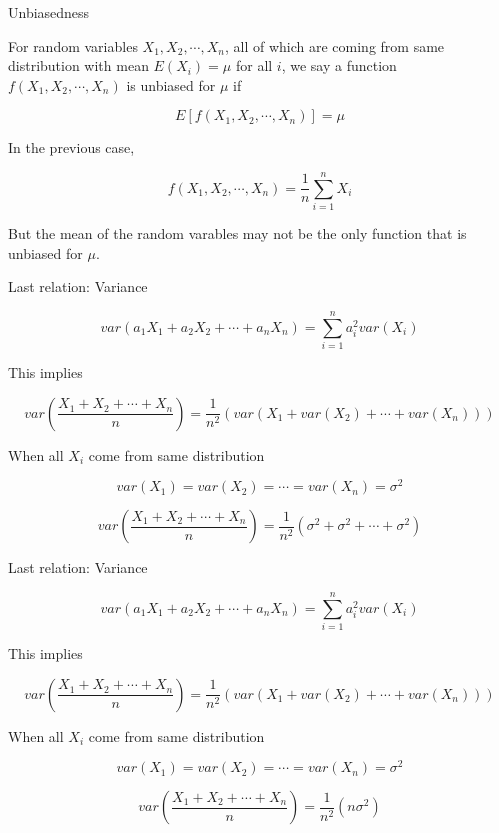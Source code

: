 \documentclass{beamer}\usepackage[]{graphicx}\usepackage[]{color}
\begin{document}
\begin{frame}{Unbiasedness}

For random variables $X_1, X_2, \cdots, X_n$, all of which are coming from same distribution with mean $E(X_i)=\mu$ for all $i$,  we say a function $f(X_1, X_2, \cdots, X_n)$
is unbiased for $\mu$ if 

$$ E \left [f(X_1, X_2, \cdots, X_n) \right ] =  \mu$$

In the previous case, 

$$ f(X_1, X_2, \cdots, X_n) = \frac{1}{n} \sum_{i=1}^{n} X_{i}  $$

But the mean of the random varables may not be the only function that is unbiased for 
$\mu$. 

\end{frame}


\begin{frame}{Last relation: Variance}

$$ var(a_1X_1+ a_2 X_2 + \cdots + a_nX_n) = \sum_{i=1}^{n} a^2_{i} var (X_{i}) $$ \pause

This implies 

$$ var \left (\frac{X_1 + X_2 + \cdots + X_{n}}{n} \right ) = \frac{1}{n^2} \left (var(X_1 + var(X_2) + \cdots + var(X_n)) \right ) $$ \pause

When all $X_i$ come from same distribution

$$ var(X_1) = var(X_2) = \cdots = var(X_n) = \sigma^2 $$ \pause 

$$ var \left (\frac{X_1 + X_2 + \cdots + X_{n}}{n} \right ) = \frac{1}{n^2} \left (\sigma^2 + \sigma^2 + \cdots + \sigma^2 \right) $$

\end{frame}

\begin{frame}{Last relation: Variance}

$$ var(a_1X_1+ a_2 X_2 + \cdots + a_nX_n) = \sum_{i=1}^{n} a^2_{i} var (X_{i}) $$

This implies 

$$ var \left (\frac{X_1 + X_2 + \cdots + X_{n}}{n} \right ) = \frac{1}{n^2} \left (var(X_1 + var(X_2) + \cdots + var(X_n)) \right ) $$

When all $X_i$ come from same distribution

$$ var(X_1) = var(X_2) = \cdots = var(X_n) = \sigma^2 $$

$$ var \left (\frac{X_1 + X_2 + \cdots + X_{n}}{n} \right ) = \frac{1}{n^2}(n \sigma^2) $$

\end{frame}
\end{document}
